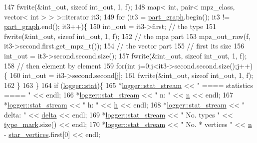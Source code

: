 \begin{DoxyCode}
147   fwrite(&int\_out, \textcolor{keyword}{sizeof} int\_out, 1, f);
148   map< int, pair< mpz\_class, vector< int > > >::iterator it3;
149   \textcolor{keywordflow}{for} (it3 = \hyperlink{classmarked__graph__compressed_ae179a4737e6eab905c18a94d44ef64b7}{part\_graph}.begin(); it3 != \hyperlink{classmarked__graph__compressed_ae179a4737e6eab905c18a94d44ef64b7}{part\_graph}.end(); it3++)\{
150     int\_out = it3->first; \textcolor{comment}{// the type}
151     fwrite(&int\_out, \textcolor{keyword}{sizeof} int\_out, 1, f);
152     \textcolor{comment}{// the mpz part}
153     mpz\_out\_raw(f, it3->second.first.get\_mpz\_t());
154     \textcolor{comment}{// the vector part}
155     \textcolor{comment}{// first its size}
156     int\_out = it3->second.second.size();
157     fwrite(&int\_out, \textcolor{keyword}{sizeof} int\_out, 1, f);
158     \textcolor{comment}{// then element by element}
159     \textcolor{keywordflow}{for}(\textcolor{keywordtype}{int} j=0;j<it3->second.second.size();j++)\{
160       int\_out = it3->second.second[j];
161       fwrite(&int\_out, \textcolor{keyword}{sizeof} int\_out, 1, f);
162     \}
163   \}
164   \textcolor{keywordflow}{if} (\hyperlink{classlogger_a26812b5ba03f130e8dae3446d5fc032f}{logger::stat})\{
165     *\hyperlink{classlogger_a7db37821f875f2ba3540980b355779f5}{logger::stat\_stream} << \textcolor{stringliteral}{" ==== statistics ==== "} << endl;
166     *\hyperlink{classlogger_a7db37821f875f2ba3540980b355779f5}{logger::stat\_stream} << \textcolor{stringliteral}{" n:                "} << \hyperlink{classmarked__graph__compressed_a8d841016ddb11cfd33748c8deb6277ba}{n} << endl;
167     *\hyperlink{classlogger_a7db37821f875f2ba3540980b355779f5}{logger::stat\_stream} << \textcolor{stringliteral}{" h:                "} << \hyperlink{classmarked__graph__compressed_af6ff623407b673d08d0cab77b39c2193}{h} << endl;
168     *\hyperlink{classlogger_a7db37821f875f2ba3540980b355779f5}{logger::stat\_stream} << \textcolor{stringliteral}{" delta:            "} << \hyperlink{classmarked__graph__compressed_a8b2aaac68e9332ddc78d88eb60b323a7}{delta} << endl;
169     *\hyperlink{classlogger_a7db37821f875f2ba3540980b355779f5}{logger::stat\_stream} << \textcolor{stringliteral}{" No. types         "} << 
      \hyperlink{classmarked__graph__compressed_a86b00223525703e973415cbc9c94da68}{type\_mark}.size() << endl;
170     *\hyperlink{classlogger_a7db37821f875f2ba3540980b355779f5}{logger::stat\_stream} << \textcolor{stringliteral}{" No. * vertices    "} << \hyperlink{classmarked__graph__compressed_a8d841016ddb11cfd33748c8deb6277ba}{n} - 
      \hyperlink{classmarked__graph__compressed_a7a4ced4586e2e353f9076bd447df5208}{star\_vertices}.first[0] << endl;

\end{DoxyCode}
